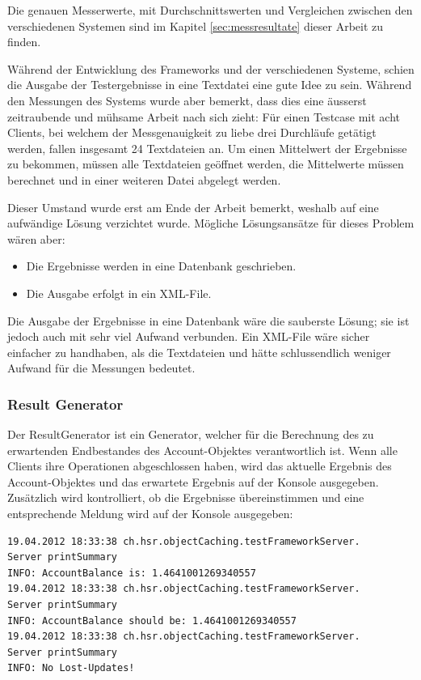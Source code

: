 Die genauen Messerwerte, mit Durch\-schnitts\-wer\-ten und Ver\-gleichen zwischen den verschiedenen Systemen sind im Kapitel \ref{sec:messresultate} dieser Arbeit zu finden. 

Während der Entwicklung des Frameworks und der verschiedenen Systeme, schien die Ausgabe der Testergebnisse in eine Textdatei eine gute Idee zu sein. Während den Messungen des Systems wurde aber bemerkt, dass dies eine äusserst zeitraubende und mühsame Arbeit nach sich zieht: Für einen Testcase mit acht Clients, bei welchem der Messgenauigkeit zu liebe drei Durchläufe getätigt werden, fallen insgesamt 24 Textdateien an. Um einen Mittelwert der Ergebnisse zu bekommen, müssen alle Textdateien geöffnet werden, die Mittelwerte müssen berechnet und in einer weiteren Datei abgelegt werden. 

Dieser Umstand wurde erst am Ende der Arbeit bemerkt, weshalb auf eine aufwändige Lösung verzichtet wurde. Mögliche Lösungsansätze für dieses Problem wären aber:
\begin{itemize}
\item Die Ergebnisse werden in eine Datenbank geschrieben.
\item Die Ausgabe erfolgt in ein XML-File.
\end{itemize}
Die Ausgabe der Ergebnisse in eine Datenbank wäre die sauberste Lösung; sie ist jedoch auch mit sehr viel Aufwand verbunden. Ein XML-File wäre sicher einfacher zu handhaben, als die Textdateien und hätte schlussendlich weniger Aufwand für die Messungen bedeutet.

\subsubsection{Result Generator}
\label{sec:resultGenerator}
Der ResultGenerator ist ein Generator, welcher für die Berechnung des zu erwartenden Endbestandes des Account-Objektes verantwortlich ist. Wenn alle Clients ihre Operationen abgeschlossen haben, wird das aktuelle Ergebnis des Account-Objektes und das erwartete Ergebnis auf der Konsole ausgegeben. Zusätzlich wird kontrolliert, ob die Ergebnisse übereinstimmen und eine entsprechende Meldung wird auf der Konsole ausgegeben:
\begin{verbatim}
19.04.2012 18:33:38 ch.hsr.objectCaching.testFrameworkServer.
Server printSummary
INFO: AccountBalance is: 1.4641001269340557
19.04.2012 18:33:38 ch.hsr.objectCaching.testFrameworkServer.
Server printSummary
INFO: AccountBalance should be: 1.4641001269340557
19.04.2012 18:33:38 ch.hsr.objectCaching.testFrameworkServer.
Server printSummary
INFO: No Lost-Updates!
\end{verbatim}


